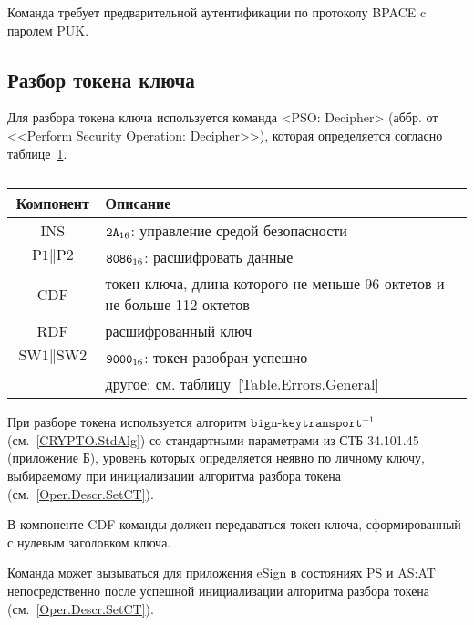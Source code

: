 Команда требует предварительной аутентификации по 
протоколу BPACE c паролем PUK. 

\subsection{Разбор токена ключа}
\label{Oper.Descr.Decipher}

Для разбора токена ключа используется 
команда <PSO: Decipher> (аббр. от 
<<Perform Security Operation: Decipher>>), 
которая определяется согласно 
таблице~\ref{Table.Oper.DecipherCmd}.

\begin{table}[hbt]
\caption{}\label{Table.Oper.DecipherCmd}
\begin{tabular}{|c|p{14cm}|}
\hline
Компонент & Описание\\ 
\hline
\hline
INS & $\texttt{2A}_{16}$: управление средой безопасности \\
\hline
$\text{P1} \parallel \text{P2}$ & $\texttt{8086}_{16}$: расшифровать
данные \\ 
\hline
CDF & токен ключа, длина которого не
меньше 96 октетов и не больше 112 октетов\\
\hline 
RDF &  расшифрованный ключ \\
\hline
$\text{SW1} \parallel \text{SW2}$ & $\texttt{9000}_{16}$: 
токен разобран успешно\\
& другое: см. таблицу~\ref{Table.Errors.General} \\
\hline
\end{tabular}
\end{table}

При разборе токена используется алгоритм $\texttt{bign-keytransport}^{-1}$
(см.~\ref{CRYPTO.StdAlg})
со стандартными параметрами из СТБ 34.101.45 (приложение Б), 
уровень которых определяется неявно по личному ключу,
выбираемому при инициализации алгоритма разбора токена 
(см.~\ref{Oper.Descr.SetCT}). 

В компоненте CDF команды должен передаваться токен ключа, 
сформированный с нулевым заголовком ключа. 

Команда может вызываться для приложения eSign в состояниях 
PS и AS:AT непосредственно после успешной инициализации 
алгоритма разбора токена (см.~\ref{Oper.Descr.SetCT}).






